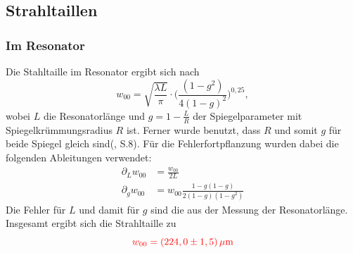 \subsection{Strahltaillen}
\subsubsection*{Im Resonator}
Die Stahltaille im Resonator ergibt sich nach 
\begin{equation*}
    w_{00} = \sqrt{\frac{\lambda L}{\pi}} \cdot \biggl(\frac{(1-g^2)}{4(1-g)^2}\biggl)^{0,25},
\end{equation*}
wobei $L$ die Resonatorlänge und $g = 1 - \frac{L}{R}$ der Spiegelparameter mit Spiegelkrümmungsradius $R$ ist. Ferner wurde benutzt, dass $R$ und somit $g$ für beide Spiegel 
gleich sind(\cite{TUB2018}, S.8). 
Für die Fehlerfortpflanzung wurden dabei die folgenden Ableitungen verwendet:
\begin{align*}
    \partial_Lw_{00}  &= \frac{w_{00}}{2L}\\
    \partial_gw_{00} &= w_{00} \frac{1 - g(1-g)}{2(1-g)(1-g^2)}
\end{align*}
Die Fehler für $L$ und damit für $g$ sind die aus der Messung der Resonatorlänge. Insgesamt ergibt sich die Strahltaille zu
\begin{equation*}
    \textcolor{red}{w_{00} = (224,0 \pm 1,5)\,\mu\mathrm{m}}
\end{equation*}

